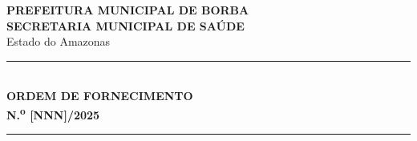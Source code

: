 \documentclass[12pt,a4paper]{article}
\newcommand{\ofNum}{[NNN]}            %
\newcommand{\exercicio}{2025}
\begin{document}
\setlength{\parindent}{0pt}

\begin{center}
  {\large\bfseries\color{navy}PREFEITURA MUNICIPAL DE BORBA}\\[1pt]
  {\normalsize\bfseries\color{navy}SECRETARIA MUNICIPAL DE SAÚDE}\\[1pt]
  {\small\color{medblue}Estado do Amazonas}\\[0.5cm]
  \textcolor{navy!25}{\rule{0.90\linewidth}{1pt}}\\[0.4cm]
  {\LARGE\bfseries\color{navy}ORDEM DE FORNECIMENTO}\\[4pt]
  {\Large\bfseries N.\textsuperscript{o} \ofNum/\exercicio}\\[0.3cm]
  \textcolor{navy!25}{\rule{0.90\linewidth}{0.6pt}}
\end{center}

\vspace{0.3cm}
\end{document}
